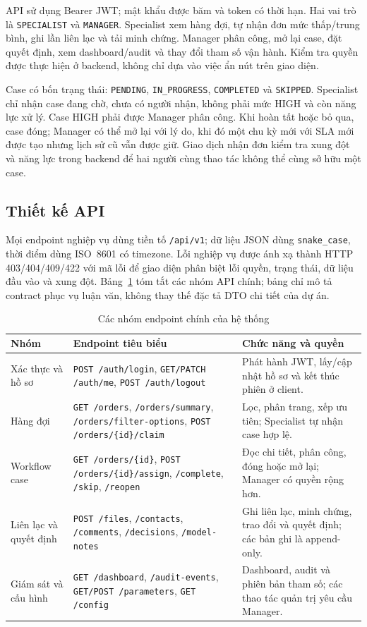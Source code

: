API sử dụng Bearer JWT; mật khẩu được băm và token có thời hạn. Hai vai trò là \texttt{SPECIALIST} và \texttt{MANAGER}. Specialist xem hàng đợi, tự nhận đơn mức thấp/trung bình, ghi lần liên lạc và tải minh chứng. Manager phân công, mở lại case, đặt quyết định, xem dashboard/audit và thay đổi tham số vận hành. Kiểm tra quyền được thực hiện ở backend, không chỉ dựa vào việc ẩn nút trên giao diện.

Case có bốn trạng thái: \texttt{PENDING}, \texttt{IN\_PROGRESS}, \texttt{COMPLETED} và \texttt{SKIPPED}. Specialist chỉ nhận case đang chờ, chưa có người nhận, không phải mức HIGH và còn năng lực xử lý. Case HIGH phải được Manager phân công. Khi hoàn tất hoặc bỏ qua, case đóng; Manager có thể mở lại với lý do, khi đó một chu kỳ mới với SLA mới được tạo nhưng lịch sử cũ vẫn được giữ. Giao dịch nhận đơn kiểm tra xung đột và năng lực trong backend để hai người cùng thao tác không thể cùng sở hữu một case.

\subsection{Thiết kế API}

Mọi endpoint nghiệp vụ dùng tiền tố \texttt{/api/v1}; dữ liệu JSON dùng \texttt{snake\_case}, thời điểm dùng ISO~8601 có timezone. Lỗi nghiệp vụ được ánh xạ thành HTTP 403/404/409/422 với mã lỗi để giao diện phân biệt lỗi quyền, trạng thái, dữ liệu đầu vào và xung đột. Bảng~\ref{tab:api-groups} tóm tắt các nhóm API chính; bảng chỉ mô tả contract phục vụ luận văn, không thay thế đặc tả DTO chi tiết của dự án.

\begin{table}[htbp]
\centering\small
\caption{Các nhóm endpoint chính của hệ thống}
\label{tab:api-groups}
\begin{tabular}{@{}p{3.0cm}p{5.1cm}p{5.0cm}@{}}
\toprule
Nhóm & Endpoint tiêu biểu & Chức năng và quyền \\
\midrule
Xác thực và hồ sơ & \texttt{POST /auth/login}, \texttt{GET/PATCH /auth/me}, \texttt{POST /auth/logout} & Phát hành JWT, lấy/cập nhật hồ sơ và kết thúc phiên ở client. \\
Hàng đợi & \texttt{GET /orders}, \texttt{/orders/summary}, \texttt{/orders/filter-options}, \texttt{POST /orders/\{id\}/claim} & Lọc, phân trang, xếp ưu tiên; Specialist tự nhận case hợp lệ. \\
Workflow case & \texttt{GET /orders/\{id\}}, \texttt{POST /orders/\{id\}/assign}, \texttt{/complete}, \texttt{/skip}, \texttt{/reopen} & Đọc chi tiết, phân công, đóng hoặc mở lại; Manager có quyền rộng hơn. \\
Liên lạc và quyết định & \texttt{POST /files}, \texttt{/contacts}, \texttt{/comments}, \texttt{/decisions}, \texttt{/model-notes} & Ghi liên lạc, minh chứng, trao đổi và quyết định; các bản ghi là append-only. \\
Giám sát và cấu hình & \texttt{GET /dashboard}, \texttt{/audit-events}, \texttt{GET/POST /parameters}, \texttt{GET /config} & Dashboard, audit và phiên bản tham số; các thao tác quản trị yêu cầu Manager. \\
\bottomrule
\end{tabular}
\end{table}

